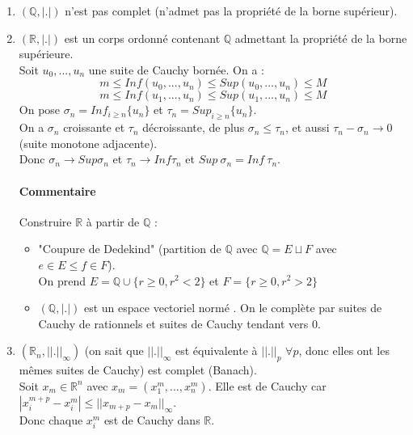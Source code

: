 \documentclass[a4paper, oneside]{report}
\newcommand{\R}{\mathbb{R}}
\newcommand{\Q}{\mathbb{Q}}
\newcommand{\evn}{espace vectoriel normé }
\begin{document}
\begin{enumerate}
\item $(\Q, |.|)$ n'est pas complet (n'admet pas la propriété de la borne supérieur).
\item $(\R, |.|)$ est un corps ordonné contenant $\Q$ admettant la propriété de la borne supérieure.\\
Soit $u_0,...,u_n$ une suite de Cauchy bornée. On a :
$$m\leq Inf(u_0,...,u_n)\leq Sup(u_0,...,u_n)\leq M$$
$$m\leq Inf(u_1,...,u_n)\leq Sup(u_1,...,u_n)\leq M$$
On pose $\sigma_n=Inf_{i\geq n}\{u_n\}$ et $\tau_n=Sup_{i\geq n}\{u_n\}$.\\
On a $\sigma_n$ croissante et $\tau_n$ décroissante, de plus $\sigma_n \leq \tau_n$, et aussi $\tau_n - \sigma_n \rightarrow 0$ (suite monotone adjacente).\\
Donc $\sigma_n \rightarrow Sup\sigma_n$ et $\tau_n \rightarrow Inf \tau_n$ et $Sup~\sigma_n = Inf~\tau_n$.

\paragraph{Commentaire}
Construire $\R$ à partir de $\Q$ :
\begin{itemize}
\item "Coupure de Dedekind" (partition de $\Q$ avec $\Q=E\sqcup F$ avec $e\in E \leq f\in F$).\\
On prend $E=\Q \cup \{r\geq 0, r^2<2 \}$ et $F=\{r\geq 0, r^2>2 \}$

\item $(\Q, |.|)$ est un \evn. On le complète par {suites de Cauchy de rationnels} et {suites de Cauchy tendant vers 0}.
\end{itemize}

\item $(\R_n, ||.||_\infty)$ (on sait que $||.||_\infty$ est équivalente à $||.||_p$ $\forall p$, donc elles ont les mêmes suites de Cauchy) est complet (Banach).\\
Soit $x_m \in \R^n$ avec $x_m=(x_1^m,...,x_n^m)$. Elle est de Cauchy car $|x_i^{m+p}-x_i^m| \leq ||x_{m+p}-x_m||_\infty$.\\
Donc chaque $x_i^m$ est de Cauchy dans $\R$.


\end{enumerate}
\end{document}
